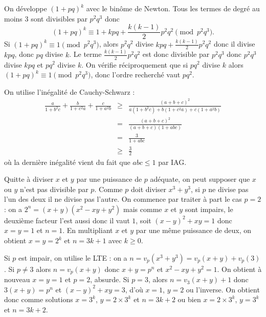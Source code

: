 \begin{sol}
On développe $(1+pq)^k$ avec le binôme de Newton. Tous les termes de degré au moins $3$ sont divisibles par $p^2 q^3$ donc
\[(1+pq)^k \equiv 1+kpq+\frac{k(k-1)}{2} p^2 q^2 \pmod{p^2 q^3}.\]
Si $(1+pq)^k \equiv 1 \pmod{p^2 q^3}$, alors $p^2 q^2$ divise $kpq+\frac{k(k-1)}{2} p^2 q^2$ donc il divise $k pq$, donc $pq$ divise $k$. Le terme $\frac{k(k-1)}{2} p^2 q^2$ est donc divisible par $p^2 q^3$ donc $p^2 q^3$ divise $kpq$ et $pq^2$ divise $k$. On vérifie réciproquement que si $pq^2$ divise $k$ alors $(1+pq)^k \equiv 1 \pmod{p^2 q^3}$, donc l'ordre recherché vaut $p q^2$.
\end{sol}

\begin{sol}
On utilise l'inégalité de Cauchy-Schwarz :
\begin{eqnarray*}
\frac{a}{1+b^2c}+\frac{b}{1+c^2a}+\frac{c}{1+a^2b} & \geqslant & \frac{(a+b+c)^2}{a(1+b^2 c)+b(1+c^2 a)+c(1+a^2 b)}\\
&=& \frac{(a+b+c)^2}{(a+b+c)(1+abc)}\\
&=& \frac{3}{1+abc}\\
& \geqslant & \frac{3}{2}
\end{eqnarray*}
où la dernière inégalité vient du fait que $abc \leqslant 1$ par IAG.
\end{sol}

\begin{sol}
Quitte à diviser $x$ et $y$ par une puissance de $p$ adéquate, on peut supposer que $x$ ou $y$ n'est pas divisible par $p$. Comme $p$ doit diviser $x^3+y^3$, si $p$ ne divise pas l'un des deux il ne divise pas l'autre. On commence par traiter à part le cas $p=2$ : on a $2^n=(x+y)(x^2-xy+y^2)$ mais comme $x$ et $y$ sont impairs, le deuxième facteur l'est aussi donc il vaut $1$, soit $(x-y)^2+xy=1$ donc $x=y=1$ et $n=1$. En multipliant $x$ et $y$ par une même puissance de deux, on obtient $x=y=2^k$ et $n=3k+1$ avec $k \geq 0$.

Si $p$ est impair, on utilise le LTE : on a $n=v_p(x^3+y^3)=v_p(x+y)+v_p(3)$. Si $p \ne 3$ alors $n=v_p(x+y)$ donc $x+y=p^n$ et $x^2-xy+y^2=1$. On obtient à nouveau $x=y=1$ et $p=2$, absurde. Si $p=3$, alors $n=v_3(x+y)+1$ donc $3(x+y)=p^n$ et $(x-y)^2+xy=3$, d'où $x=1$, $y=2$ ou l'inverse. On obtient donc comme solutions $x=3^k$, $y=2 \times 3^k$ et $n=3k+2$ ou bien $x=2 \times 3^k$, $y= 3^k$ et $n=3k+2$.
\end{sol}

